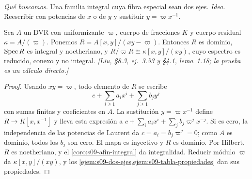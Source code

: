 \emph{Qué buscamos.} Una familia integral cuya fibra especial sean dos ejes. \emph{Idea.} Reescribir con potencias de $x$ o de $y$ y sustituir $y=\varpi x^{-1}$.

\begin{prop}[La familia $xy=\varpi$]
\label{prop:s09-familia-nodal}
Sea $A$ un DVR con uniformizante $\varpi$, cuerpo de fracciones $K$ y cuerpo residual $\kappa=A/(\varpi)$. Ponemos $R=A[x,y]/(xy-\varpi)$. Entonces $R$ es dominio, $\operatorname{Spec} R$ es integral y noetheriano, y $R/\varpi R\cong\kappa[x,y]/(xy)$, cuyo espectro es reducido, conexo y no integral. \emph{[Liu, \S8.3, ej.~3.53 y \S4.1, lema~1.18; la prueba es un cálculo directo.]}
\end{prop}
\begin{proof}
Usando $xy=\varpi$, todo elemento de $R$ se escribe
\[
c+\sum_{i\ge1}a_ix^i+\sum_{j\ge1}b_jy^j
\]
con sumas finitas y coeficientes en $A$. La sustitución $y=\varpi x^{-1}$ define $R\to K[x,x^{-1}]$ y lleva esta expresión a $c+\sum_i a_ix^i+\sum_j b_j\varpi^jx^{-j}$. Si es cero, la independencia de las potencias de Laurent da $c=a_i=b_j\varpi^j=0$; como $A$ es dominio, todos los $b_j$ son cero. El mapa es inyectivo y $R$ es dominio. Por Hilbert, $R$ es noetheriano, y el \cref{coro:s09-afin-integral} da integralidad. Reducir módulo $\varpi$ da $\kappa[x,y]/(xy)$, y los \cref{ejem:s09-dos-ejes,ejem:s09-tabla-propiedades} dan sus propiedades.
\end{proof}

